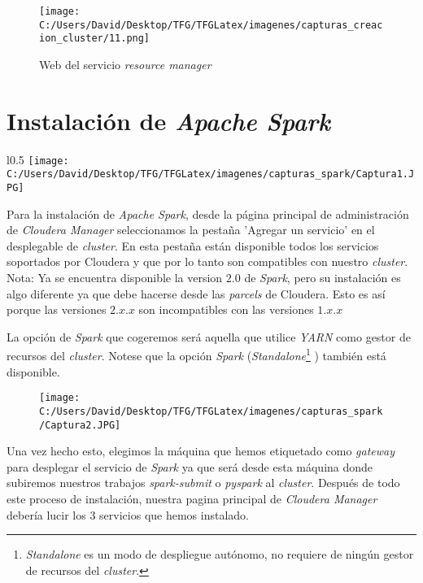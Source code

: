 \begin{figure}[!htpb]
  \centering
  \texttt{[image: C:/Users/David/Desktop/TFG/TFGLatex/imagenes/capturas\_creacion\_cluster/11.png]}
  \caption[Web del servicio \textit{Resource Manager}]{Web del servicio \textit{resource manager}}
\end{figure}

\clearpage

\section{Instalación de \textit{Apache Spark}}\label{sec:instalacion_spark}
             
\begin{wrapfigure}[]{l}{0.5\textwidth}
  \centering
  \texttt{[image: C:/Users/David/Desktop/TFG/TFGLatex/imagenes/capturas\_spark/Captura1.JPG]}
\end{wrapfigure}

Para la instalación de \textit{Apache Spark}, desde la página principal de administración de \textit{Cloudera Manager}
seleccionamos la pestaña 'Agregar un servicio' en el desplegable de \textit{cluster}.
En esta pestaña están disponible todos los servicios soportados por Cloudera y que por lo tanto son compatibles
con nuestro \textit{cluster}.\\
Nota: Ya se encuentra disponible la version $2.0$ de \textit{Spark}, pero su
instalación es algo diferente ya que debe hacerse desde las \textit{parcels} de Cloudera. Esto es así porque
las versiones $2.x.x$ son incompatibles con las versiones $1.x.x$
\newline

La opción de \textit{Spark} que cogeremos será aquella que utilice \textit{YARN} como gestor de recursos del
\textit{cluster}.
Notese que la opción \textit{Spark} (\textit{Standalone}\footnote{\textit{Standalone} es un modo de despliegue
autónomo, no requiere de ningún gestor de recursos del \textit{cluster}.}
) también está disponible.

\begin{figure}[!htpb]
  \centering
  \texttt{[image: C:/Users/David/Desktop/TFG/TFGLatex/imagenes/capturas\_spark/Captura2.JPG]}
\end{figure}

Una vez hecho esto, elegimos la máquina que hemos etiquetado como \textit{gateway} para desplegar el servicio
de \textit{Spark} ya que será desde esta máquina donde subiremos nuestros trabajos 
\textit{spark-submit} o \textit{pyspark} al \textit{cluster}.
Después de todo este proceso de instalación, nuestra pagina principal de \textit{Cloudera Manager} debería lucir los 
3 servicios que hemos instalado.

